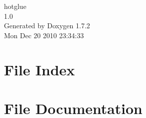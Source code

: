 \documentclass[a4paper]{book}
\begin{document}
\hypersetup{pageanchor=false}
\begin{titlepage}
\vspace*{7cm}
\begin{center}
{\Large hotglue \\[1ex]\large 1.0 }\\
\vspace*{1cm}
{\large Generated by Doxygen 1.7.2}\\
\vspace*{0.5cm}
{\small Mon Dec 20 2010 23:34:33}\\
\end{center}
\end{titlepage}
\clearemptydoublepage
{}
\tableofcontents
\clearemptydoublepage
{}
\hypersetup{pageanchor=true}
\chapter{File Index}

\chapter{File Documentation}























\printindex
\end{document}
